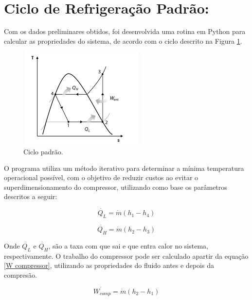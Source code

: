 \section{Ciclo de Refrigeração Padrão:}

Com os dados preliminares obtidos, foi desenvolvida uma rotina em Python para calcular as propriedades do sistema, de acordo com o ciclo descrito na Figura \ref{fig:ciclo padrão}. 

\begin{figure}
    \centering
    \includegraphics[width=0.6\linewidth]{Imagens/Desenvolvimento/Diagrama.png}
    \caption{Ciclo padrão.}
    \label{fig:ciclo padrão}
\end{figure}

\newpage

O programa utiliza um método iterativo para determinar a  mínima temperatura operacional possível, com o objetivo de reduzir custos ao evitar o superdimensionamento do compressor, utilizando como base os parâmetros descritos a seguir:

\begin{equation}
    \dot{Q_L} = \dot{m}(h_1-h_4)
    \label{QL}
\end{equation}

\begin{equation}
    \dot{Q_H} = \dot{m}(h_2-h_3)
    \label{QH}
\end{equation}

    Onde $\dot{Q_L}$ e $\dot{Q_H}$, são  a taxa com que sai e que entra calor no sistema, respectivamente. O trabalho do compressor pode ser calculado apartir da equação \ref{W compressor}, utilizando as propriedades do fluido antes e depois da compresão.

\begin{equation}
    \dot{W_{comp}} = \dot{m}(h_2-h_1)
    \label{W compressor}
\end{equation}

